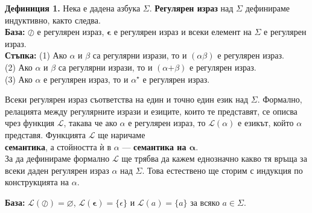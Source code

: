 \documentclass[openany]{book}
\newcommand{\bleft}{
    \boldsymbol{\left(\right.}
}
\newcommand{\bright}{
    \boldsymbol{\left.\right)}
}
\newcommand{\bplus}{
    \boldsymbol{+}
}
\newcommand{\bepsilon}{
    \boldsymbol{\epsilon}
}
\begin{document}
            \vspace{15pt}
        
            \textbf{Дефиниция 1.} Нека е дадена азбука $\Sigma$. \textbf{Регулярен израз} над
            $\Sigma$ дефинираме индуктивно, както следва. \\
            \vspace{10pt}
            \textbf{База:} $\oslash$ е регулярен израз, $\bepsilon$ е регулярен израз
            и всеки елемент на $\Sigma$ е регулярен израз. \\
            \vspace{5pt}
            \textbf{Стъпка:} (1) Ако $\alpha$ и $\beta$ са регулярни изрази, то и $\bleft \alpha \beta \bright$
            е регулярен израз. \\
            (2) Ако $\alpha$ и $\beta$ са регулярни изрази, то и $\bleft \alpha \bplus \beta \bright$
            е регулярен израз. \\
            (3) Ако $\alpha$ е регулярен израз, то и $\alpha^\star$ е регулярен израз.
        
            \vspace{10pt}
        
            \hspace{15pt} Всеки регулярен израз съответства на един и точно един език над $\Sigma$.
            Формално, релацията между регулярните изрази и езиците, които те представят, се описва
            чрез функция $\mathscr{L}$, такава че ако $\alpha$ е регулярен израз, то $\mathscr{L}(\alpha)$
            е езикът, който $\alpha$ представя. Функцията $\mathscr{L}$ ще наричаме \\
            \textbf{семантика}, а стойността ѝ в $\alpha$ — \textbf{семантика на $\boldsymbol{\alpha}$}. \\
            \hspace{15pt} За да дефинираме формално $\mathscr{L}$ ще трябва да кажем еднозначно
            какво тя връща за всеки даден регулярен израз $\alpha$ над $\Sigma$. Това естествено
            ще сторим с индукция по конструкцията на $\alpha$. \\
        
            \vspace{10pt}
        
            \textbf{База:} $\mathscr{L}(\oslash) = \varnothing$, $\mathscr{L}(\bepsilon) = \{\epsilon\}$ и $\mathscr{L}(a) = \{a\}$ за всяко $a \in \Sigma$. \\
            
\end{document}

